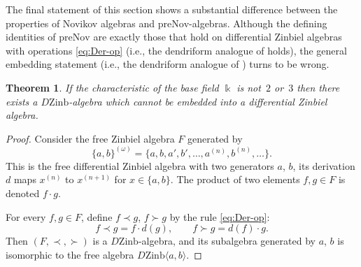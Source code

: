 \documentclass[11pt]{article}
\numberwithin{equation}{section}
\numberwithin{equation}{section}
\newtheorem{Theorem}{Theorem}[section]
\def\Nov{\mathrm{Nov}}
\def\Zinb{\mathrm{Zinb}}
\def\pre{\mathrm{pre}}
\begin{document}
The final statement of this section shows a substantial difference
between the properties of Novikov algebras and $\pre\Nov $-algebras.
Although the defining identities of $\pre\Nov $
are exactly those that hold on differential Zinbiel algebras
with operations \eqref{eq:Der-op}
(i.e.,
the dendriform analogue of \cite[Theorem~7.8]{DzhLofwall2002}
holds),
the general embedding statement (i.e., the dendriform analogue
of \cite[Theorem~3]{BCZ-2017})
turns to be wrong.

\begin{Theorem}%
If the characteristic of the base field $\Bbbk $ is not~$2$ or~$3$
then there exists a $D\Zinb $-algebra which cannot be embedded into a differential Zinbiel algebra.
\end{Theorem}

\begin{proof}
Consider the free Zinbiel algebra $F$ generated
by
\[
\{a,b\}^{(\omega )} = \bigl\{a,b,a',b', \dots, a^{(n)}, b^{(n)}, \dots \bigr\}.
\]
This is the free differential Zinbiel algebra
with two
generators $a$, $b$, its derivation $d$ maps $x^{(n)}$ to $x^{(n+1)}$
for $x\in \{a,b\}$. The product of two elements $f,g\in F$ is denoted
$f\cdot g$.

For every $f,g\in F$, define $f\prec g$, $f\succ g$
by the rule \eqref{eq:Der-op}:
\[
f\prec g = f\cdot d(g),\qquad f\succ g = d(f)\cdot g.
\]
Then $(F,\prec, \succ )$ is a $D\Zinb $-algebra, and its
subalgebra generated by $a$, $b$ is isomorphic to the free algebra $D\Zinb \langle a,b\rangle $.


\end{proof}
\end{document}
